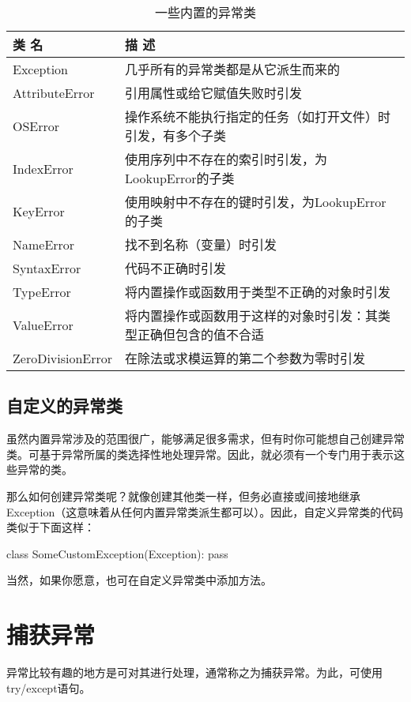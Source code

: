 \begin{table}
    \centering
    \caption{一些内置的异常类}
    \label{builtinexceptionclasses}
    \begin{tabular}{ll}
        \hline
        类 名               & 描 述                              \\
        \hline
        Exception         & 几乎所有的异常类都是从它派生而来的                \\
        AttributeError    & 引用属性或给它赋值失败时引发                   \\
        OSError           & 操作系统不能执行指定的任务（如打开文件）时引发，有多个子类    \\
        IndexError        & 使用序列中不存在的索引时引发，为LookupError的子类   \\
        KeyError          & 使用映射中不存在的键时引发，为LookupError的子类    \\
        NameError         & 找不到名称（变量）时引发                     \\
        SyntaxError       & 代码不正确时引发                         \\
        TypeError         & 将内置操作或函数用于类型不正确的对象时引发            \\
        ValueError        & 将内置操作或函数用于这样的对象时引发：其类型正确但包含的值不合适 \\
        ZeroDivisionError & 在除法或求模运算的第二个参数为零时引发              \\
        \hline
    \end{tabular}
\end{table}
\subsection{自定义的异常类}
虽然内置异常涉及的范围很广，能够满足很多需求，但有时你可能想自己创建异常类。可基于异常所属的类选择性地处理异常。因此，就必须有一个专门用于表示这些异常的类。

那么如何创建异常类呢？就像创建其他类一样，但务必直接或间接地继承Exception（这意味着从任何内置异常类派生都可以）。因此，自定义异常类的代码类似于下面这样：
\begin{pyc}
class SomeCustomException(Exception):
    pass
\end{pyc}
当然，如果你愿意，也可在自定义异常类中添加方法。
\section{捕获异常}
异常比较有趣的地方是可对其进行处理，通常称之为捕获异常。为此，可使用try/except语句。

